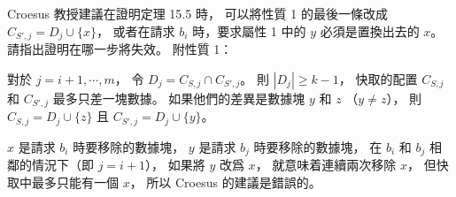 \startPROBLEM
Croesus 教授建議在證明定理 15.5 時，
可以將性質 1 的最後一條改成 $C_{S',j}=D_j\cup \{x\}$，
或者在請求 $b_i$ 時，要求屬性 1 中的 $y$ 必須是置換出去的 $x$。
請指出證明在哪一步將失效。
附性質 1：

對於 $j=i+1,\cdots,m$，
令 $D_j = C_{S,j}\cap C_{S',j}$。
則 $|D_j|\ge k-1$，
快取的配置 $C_{S,j}$ 和 $C_{S',j}$ 最多只差一塊數據。
如果他們的差異是數據塊 $y$ 和 $z$ （$y\ne z$），
則 $C_{S,j}=D_j\cup \{z\}$
 且 $C_{S',j}=D_j\cup\{y\}$。
\stopPROBLEM

\startANSWER
$x$ 是請求 $b_i$ 時要移除的數據塊，
 $y$ 是請求 $b_j$ 時要移除的數據塊，
在 $b_i$ 和 $b_j$ 相鄰的情況下（即 $j=i+1$），
如果將 $y$ 改爲 $x$，
就意味着連續兩次移除 $x$，
但快取中最多只能有一個 $x$，
所以 Croesus 的建議是錯誤的。
\stopANSWER
